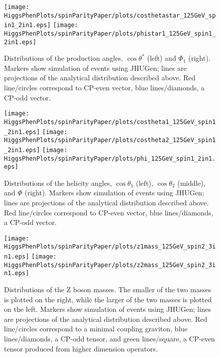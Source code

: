 \begin{figure}
\begin{center}
\texttt{[image: HiggsPhenPlots/spinParityPaper/plots/costhetastar\_125GeV\_spin1\_2in1.eps]}
\texttt{[image: HiggsPhenPlots/spinParityPaper/plots/phistar1\_125GeV\_spin1\_2in1.eps]}
\label{fig:VectorProdAngles}
\caption{Distributions of the production angles, $\cos\theta^*$ (left) and 
$\Phi_1$ (right).  Markers show simulation of events using JHUGen; lines 
are projections
of the analytical distribution described above.   Red line/circles correspond
to CP-even vector, blue lines/diamonds, a CP-odd vector.}
\end{center}
\end{figure}

\begin{figure}
\begin{center}
\texttt{[image: HiggsPhenPlots/spinParityPaper/plots/costheta1\_125GeV\_spin1\_2in1.eps]}
\texttt{[image: HiggsPhenPlots/spinParityPaper/plots/costheta2\_125GeV\_spin1\_2in1.eps]}
\texttt{[image: HiggsPhenPlots/spinParityPaper/plots/phi\_125GeV\_spin1\_2in1.eps]}
\label{fig:VectorHelicityAngles}
\caption{Distributions of the helicity angles, $\cos\theta_1$ (left), 
$\cos\theta_2$ (middle), and $\Phi$ (right). Markers show simulation of 
events using JHUGen; lines are projections
of the analytical distribution described above.  Red line/circles correspond
to CP-even vector, blue lines/diamonds, a CP-odd vector.}
\end{center}
\end{figure}

\begin{figure}
\begin{center}
\texttt{[image: HiggsPhenPlots/spinParityPaper/plots/z1mass\_125GeV\_spin2\_3in1.eps]}
\texttt{[image: HiggsPhenPlots/spinParityPaper/plots/z2mass\_125GeV\_spin2\_3in1.eps]}
\label{fig:TensorMasses}
\caption{Distributions of the Z boson masses.  The smaller of the two masses is
plotted on the right, while the larger of the two masses is plotted on the
left. Markers show simulation of events using JHUGen; lines are projections
of the analytical distribution described above.  Red line/circles correspond
to a minimal coupling graviton, blue lines/diamonds, a CP-odd tensor, 
and green lines/square, 
a CP-even tensor produced from higher dimension operators.}
\end{center}
\end{figure}

